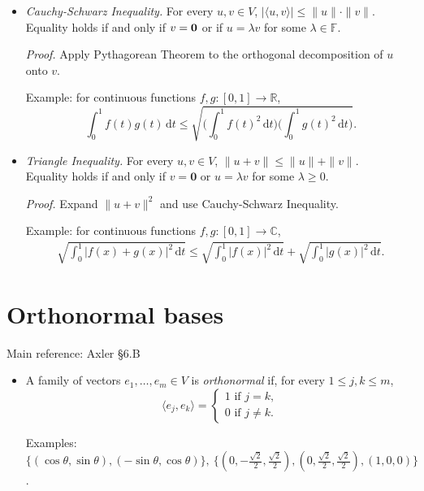 \documentclass[11pt]{article}
\newcommand{\1}{\mathbf{1}}
\newcommand{\dd}{{\mathrm{d}}}
\newcommand{\0}{\mathbf{0}}
\newcommand{\C}{\mathbb{C}}
\newcommand{\R}{\mathbb{R}}
\renewcommand{\leq}{\leqslant}
\renewcommand{\geq}{\geqslant}
\begin{document}
{\begin{itemize}
\item

\emph{Cauchy-Schwarz Inequality.}
For every $u,v\in V$, $|\langle u,v\rangle|\leq \|u\|\cdot\| v\|$.
\\
Equality holds if and only if $v={\bf 0}$ or if $u=\lambda v$ for some $\lambda\in\mathbb{F}$.

\emph{Proof.}
Apply Pythagorean Theorem to the orthogonal decomposition of $u$ onto $v$.

Example:
for continuous functions $f,g:[0,1]\to \R$,
\[
\int_0^1 f(t)g(t) \, \dd t \leq \sqrt{\Big(\int_{0}^{1}f(t)^2 \, \dd t \Big)\Big(\int_{0}^{1} g(t)^2 \, \dd t \Big)}
.
\]

\item

\emph{Triangle Inequality.}
For every $u,v\in V$, $\|u+v\| \leq \|u\| + \|v\|$.
\\
Equality holds if and only if $v=\0$ or $u=\lambda v$ for some $\lambda \geq 0$.

\emph{Proof.}
Expand $\|u+v\|^2$ and use Cauchy-Schwarz Inequality.

Example:
for continuous functions $f,g:[0,1]\to \C$,
\begin{align*}
\sqrt{ \int_{0}^{1} |f(x)+g(x)|^2 \, \dd t }
\leq
\sqrt{ \int_{0}^{1} |f(x)|^2 \, \dd t }
+
\sqrt{ \int_{0}^{1} |g(x)|^2 \, \dd t }
.\end{align*}

\end{itemize}


\clearpage
\section{Orthonormal bases}

Main reference:
Axler \S6.B

\begin{itemize}

\item

A family of vectors $e_1,\dots,e_m\in V$ is \emph{orthonormal} if, for every $1\leq j,k\leq m$, 
\[
\langle e_j,e_k\rangle=
\left\{
\begin{array}{c}
1\text{ if } j=k , \\
0\text{ if } j\neq k.
\end{array}
\right.
\]

Examples: $\{(\cos \theta, \sin \theta),(-\sin \theta, \cos \theta)\},\
\{(0, -\frac{\sqrt{2}}{2}, \frac{\sqrt{2}}{2}),(0, \frac{\sqrt{2}}{2}, \frac{\sqrt{2}}{2}), (1,0,0)\}$.


\end{itemize}}
\end{document}

